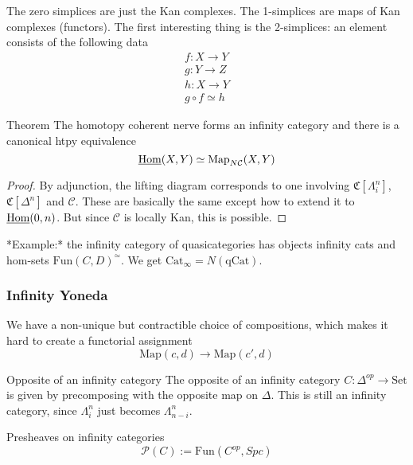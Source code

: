 The zero simplices are just the Kan complexes. The 1-simplices are maps of Kan complexes (functors). The first interesting thing is the 2-simplices: an element consists of the following data $$\begin{gathered}f:X\rightarrow Y\\ g:Y\rightarrow Z\\ h:X\rightarrow Y\\ g\circ f\simeq h\end{gathered}$$

\begin{theorem}{Theorem}{}
    The homotopy coherent nerve forms an infinity category and there is a canonical htpy equivalence $$\underline{\operatorname{Hom}}(X,Y)\simeq \mathrm{Map}_{N\mathcal{C}}(X,Y)$$
\end{theorem}
\begin{proof}
    By adjunction, the lifting diagram corresponds to one involving $\mathfrak{C}[\Lambda^n_i]$, $\mathfrak{C}[\Delta^n]$ and $\mathcal{C}$. These are basically the same except how to extend it to $\underline{\operatorname{Hom}}(0,n)$. But since $\mathcal{C}$ is locally Kan, this is possible.
\end{proof}

*Example:* the infinity category of quasicategories has objects infinity cats and hom-sets $\mathrm{Fun}(C,D)^\simeq$. We get $\mathrm{Cat}_\infty=N(\mathrm{qCat})$. 

\subsubsection{Infinity Yoneda}

We have a non-unique but contractible choice of compositions, which makes it hard to create a functorial assignment $$\mathrm{Map}(c,d)\rightarrow \mathrm{Map}(c',d)$$

\begin{definition}{Opposite of an infinity category}{}
    The opposite of an infinity category $C:\Delta^{op}\rightarrow \mathrm{Set}$ is given by precomposing with the opposite map on $\Delta$. This is still an infinity category, since $\Lambda^n_i$ just becomes $\Lambda^n_{n-i}$.  
\end{definition}


Presheaves on infinity categories
$$\mathcal{P}(C):=\mathrm{Fun}(C^{op}, Spc)$$
